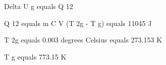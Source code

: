 Delta U g equals Q 12

Q 12 equals m C V (T 2g - T g) equals 11045 J

T 2g equals 0.003 degrees Celsius equals 273.153 K

T g equals 773.15 K